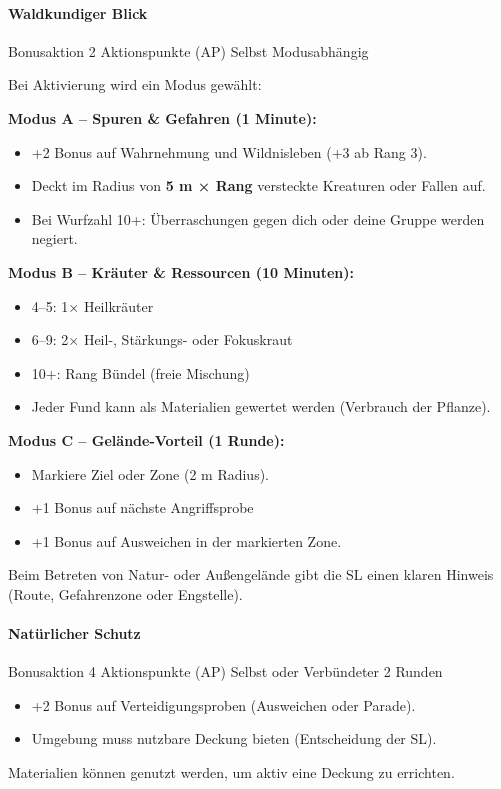 \paragraph*{Waldkundiger Blick}
\skillcard
{}
{Bonusaktion}
{2 Aktionspunkte (AP)}
{Selbst}
{Modusabhängig}
{
	Bei Aktivierung wird ein Modus gewählt:
	
	\textbf{Modus A – Spuren \& Gefahren (1 Minute):}
	\begin{itemize}
		\item +2 Bonus auf Wahrnehmung und Wildnisleben
		(+3 ab Rang 3).
		\item Deckt im Radius von \textbf{5 m × Rang} versteckte Kreaturen
		oder Fallen auf.
		\item Bei Wurfzahl 10+: Überraschungen gegen dich oder deine Gruppe
		werden negiert.
	\end{itemize}
	
	\textbf{Modus B – Kräuter \& Ressourcen (10 Minuten):}
	\begin{itemize}
		\item 4–5: 1× Heilkräuter
		\item 6–9: 2× Heil-, Stärkungs- oder Fokuskraut
		\item 10+: Rang Bündel (freie Mischung)
		\item Jeder Fund kann als Materialien gewertet werden
		(Verbrauch der Pflanze).
	\end{itemize}
	
	\textbf{Modus C – Gelände-Vorteil (1 Runde):}
	\begin{itemize}
		\item Markiere Ziel oder Zone (2 m Radius).
		\item +1 Bonus auf nächste Angriffsprobe
		\item +1 Bonus auf Ausweichen in der markierten Zone.
	\end{itemize}
}
{
	Beim Betreten von Natur- oder Außengelände gibt die SL
	einen klaren Hinweis (Route, Gefahrenzone oder Engstelle).
}

\paragraph*{Natürlicher Schutz}
\skillcard
{}
{Bonusaktion}
{4 Aktionspunkte (AP)}
{Selbst oder Verbündeter}
{2 Runden}
{
	\begin{itemize}
		\item +2 Bonus auf Verteidigungsproben (Ausweichen oder Parade).
		\item Umgebung muss nutzbare Deckung bieten
		(Entscheidung der SL).
	\end{itemize}
}
{
	Materialien können genutzt werden,
	um aktiv eine Deckung zu errichten.
}

